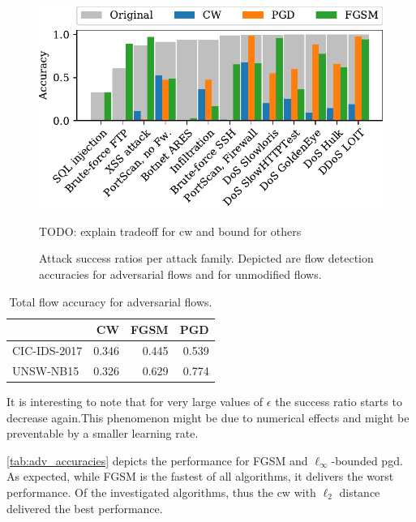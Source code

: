 \documentclass[conference]{IEEEtran}
\newcommand\note[2]{{\color{#1}#2}}
\newcommand\todo[1]{{\note{red}{TODO: #1}}}
\begin{document}


\begin{figure}
\includegraphics[width=\columnwidth]{../plots/adv_comparison/adv_comparison_17.pdf}
\caption{Attack success ratios per attack family. Depicted are flow detection accuracies for adversarial flows and for unmodified flows.}
\label{fig:adv_per_family}
\todo{explain tradeoff for cw and bound for others}
\end{figure}

\begin{table}
\centering
\caption{Total flow accuracy for adversarial flows.}
\label{tab:adv_accuracies}
\begin{tabular}{lrrr} \toprule
& CW & FGSM & PGD \\ \midrule
CIC-IDS-2017 &	0.346	 & 0.445	& 0.539 \\ 
UNSW-NB15 &	0.326&	0.629	& 0.774 \\
\bottomrule
\end{tabular}
\end{table}
It is interesting to note that for very large values of $\epsilon$ the success ratio starts to decrease again.This phenomenon might be due to numerical effects and might be preventable by a smaller learning rate.


\autoref{tab:adv_accuracies} depicts the performance for FGSM and $\ell_\infty$-bounded \gls{pgd}. 
As expected, while FGSM is the fastest of all algorithms, it delivers the worst performance. Of the investigated algorithms, thus the \gls{cw} with $\ell_2$ distance delivered the best performance.
\end{document}
